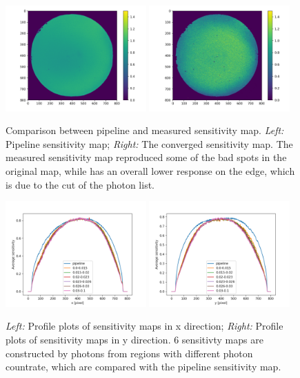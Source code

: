 \documentclass[12pt, preprint]{aastex}
\begin{document}
\begin{figure}[p]
\begin{center}
\includegraphics[width=0.48\textwidth]{figures/flato}
\includegraphics[width=0.48\textwidth]{figures/flat}
\end{center}
\caption{
  \label{flat}
  Comparison between pipeline and measured sensitivity map.
  \emph{Left:} Pipeline sensitivity map;
  \emph{Right:} The converged sensitivity map.
  The measured sensitivity map reproduced some of the bad spots in the original map, while has an overall lower response on the edge, which is due to the cut of the photon list.
}
\end{figure}

\begin{figure}[p]
\begin{center}
\includegraphics[width=0.48\textwidth]{figures/profile_x}
\includegraphics[width=0.48\textwidth]{figures/profile_y}
\end{center}
\caption{
  \label{flat-profile}
  \emph{Left:} Profile plots of sensitivity maps in x direction;
  \emph{Right:} Profile plots of sensitivity maps in y direction.
  6 sensitivty maps are constructed by photons from regions with different photon countrate, which are compared with the pipeline sensitivity map.
}
\end{figure}
\end{document}
